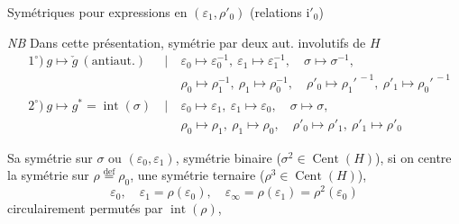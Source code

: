 \documentclass[11pt,a4paper]{article}
\begin{document}
Symétriques pour expressions en $(\varepsilon_1, \rho'_0)$ (relations \struck{\ill{}} i$'_0$)


\emph{NB} Dans cette présentation, symétrie  par deux aut. involutifs de $H$
\[
\begin{aligned}
&1^\circ)\ g \mapsto \check{g} \ (\text{antiaut.}) &\ \Big|\ & \varepsilon_0 \mapsto \varepsilon_0^{-1}, \ \varepsilon_1 \mapsto \varepsilon_1^{-1}, \quad \sigma \mapsto \sigma^{-1}, \\
& & & \rho_0 \mapsto \rho_1^{-1}, \ \rho_1 \mapsto \rho_0^{-1}, \quad \rho'_0 \mapsto \rho_1'^{\,-1}, \ \rho'_1 \mapsto \rho_0'^{\,-1} \\
&2^\circ)\ g \mapsto g^{*} = \operatorname{int}(\sigma) &\ \Big|\ & \varepsilon_0 \mapsto \varepsilon_1, \ \varepsilon_1 \mapsto \varepsilon_0, \quad \sigma \mapsto \sigma, \\
& & & \rho_0 \mapsto \rho_1, \ \rho_1 \mapsto \rho_0, \quad \rho'_0 \mapsto \rho'_1, \ \rho'_1 \mapsto \rho'_0
\end{aligned}
\]

Sa symétrie  sur $\sigma$ ou $(\varepsilon_0, \varepsilon_1)$, symétrie binaire ($\sigma^2 \in \operatorname{Cent}(H)$),  si on centre la symétrie sur $\rho \overset{\mathrm{def}}{=} \rho_0$,  une symétrie ternaire ($\rho^3 \in \operatorname{Cent}(H)$), 
\[
\varepsilon_0, \quad \varepsilon_1 = \rho(\varepsilon_0), \quad \varepsilon_\infty = \rho(\varepsilon_1) = \rho^2(\varepsilon_0)
\]
 circulairement permutés par $\operatorname{int}(\rho)$,

\end{document}

